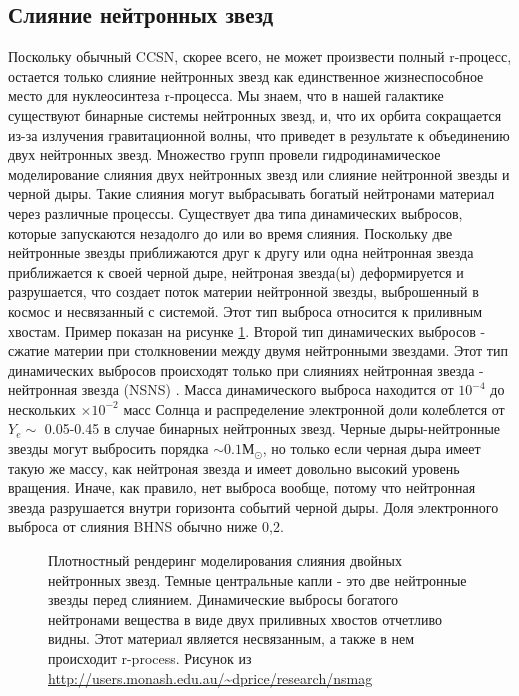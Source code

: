 \documentclass[14pt, a4paper]{article}
\numberwithin{figure}{section}
\numberwithin{equation}{section}
\begin{document}
\subsection{Слияние нейтронных звезд}

Поскольку обычный CCSN, скорее всего, не может произвести полный r-процесс, остается только слияние нейтронных звезд как единственное жизнеспособное место для нуклеосинтеза r-процесса. Мы знаем, что в нашей галактике существуют бинарные системы нейтронных звезд, и, что их орбита сокращается из-за излучения гравитационной волны, что приведет в результате к объединению двух нейтронных звезд. Множество групп провели гидродинамическое моделирование слияния двух нейтронных звезд или слияние нейтронной звезды и черной дыры. Такие слияния могут выбрасывать богатый нейтронами материал через различные процессы. Существует два типа динамических выбросов, которые запускаются незадолго до или во время слияния. Поскольку две нейтронные звезды приближаются друг к другу или одна нейтронная звезда приближается к своей черной дыре, нейтроная звезда(ы) деформируется и разрушается, что создает поток материи нейтронной звезды, выброшенный в космос и несвязанный с системой. Этот тип выброса относится к приливным хвостам. Пример показан на рисунке \ref{ris:11}. Второй тип динамических выбросов - сжатие материи при столкновении между двумя нейтронными звездами. Этот тип динамических выбросов происходят только при слияниях нейтронная звезда - нейтронная звезда (NSNS) \cite{nsns}. Масса динамического выброса находится от $10^{-4}$ до нескольких $\times 10^{-2}$ масс Солнца и распределение электронной доли колеблется от $Y_e \sim$ 0.05-0.45 в случае бинарных нейтронных звезд. Черные дыры-нейтронные звезды могут выбросить порядка $\sim 0.1 М_\odot$, но только если черная дыра имеет такую же массу, как нейтроная звезда и имеет довольно высокий уровень вращения. Иначе, как правило, нет выброса вообще, потому что нейтронная звезда разрушается внутри горизонта событий черной дыры. Доля электронного выброса от слияния BHNS обычно ниже 0,2.

\begin{figure}[ht]
	\caption{Плотностный рендеринг моделирования слияния двойных нейтронных звезд. Темные центральные капли - это две нейтронные звезды перед слиянием. Динамические выбросы богатого нейтронами вещества в виде двух приливных хвостов отчетливо видны. Этот материал является несвязанным, а также в нем происходит r-process. Рисунок из \url{http://users.monash.edu.au/~dprice/research/nsmag}}
	\label{ris:11}
\end{figure}
\end{document}
